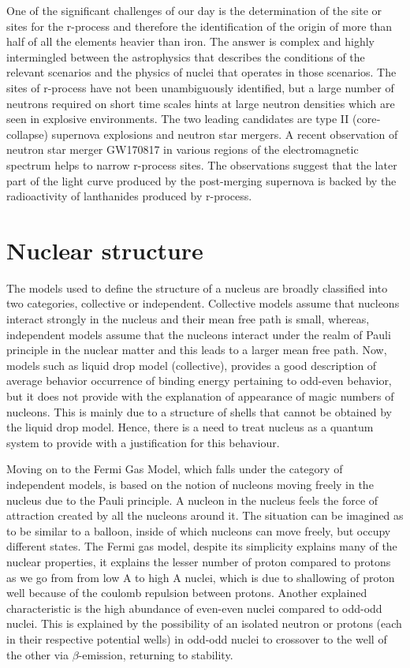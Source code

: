 One of the significant challenges of our day is the determination of the site or sites for the r-process and therefore the identification of the origin of more than half of all the elements heavier than iron. The answer is complex and highly intermingled between the astrophysics that describes the conditions of the relevant scenarios and the physics of nuclei that operates in those scenarios. The sites of r-process have not been unambiguously identified, but a large number of neutrons required on short time scales hints at large neutron densities which are seen in explosive environments. The two leading candidates are type II (core‐collapse) supernova explosions and neutron star mergers. A recent observation of neutron star merger GW170817 \citep{gw170817} in various regions of the electromagnetic spectrum helps to narrow r-process sites. The observations suggest that the later part of the light curve produced by the post-merging supernova is backed by the radioactivity of lanthanides produced by r-process. 

\section{Nuclear structure}


The models used to define the structure of a nucleus are broadly classified into two categories, collective or independent. Collective models assume that nucleons interact strongly in the nucleus and their mean free path is small, whereas, independent models assume that the nucleons interact under the realm of Pauli principle in the nuclear matter and this leads to a larger mean free path. Now, models such as liquid drop model (collective), provides a good description of average behavior occurrence of binding energy pertaining to odd-even behavior, but it does not provide with the explanation of appearance of magic numbers of nucleons. This is mainly due to a structure of shells that cannot be obtained by the liquid drop model. Hence, there is a need to treat nucleus as a quantum system to provide with a justification for this behaviour. 

Moving on to the Fermi Gas Model, which falls under the category of independent models, is based on the notion of nucleons moving freely in the nucleus due to the Pauli principle. A nucleon in the nucleus feels the force of attraction created by all the nucleons around it. The situation can be imagined as to be similar to a balloon, inside of which nucleons can move freely, but occupy different states. The Fermi gas model, despite its simplicity explains many of the nuclear properties, it explains the lesser number of proton compared to protons as we go from from low A to high A nuclei, which is due to shallowing of proton well because of the coulomb repulsion between protons. Another explained characteristic is the high abundance of even-even nuclei compared to odd-odd nuclei. This is explained by the possibility of an isolated neutron or protons (each in their respective potential wells) in odd-odd nuclei to crossover to the well of the other via $\beta$-emission, returning to stability.


